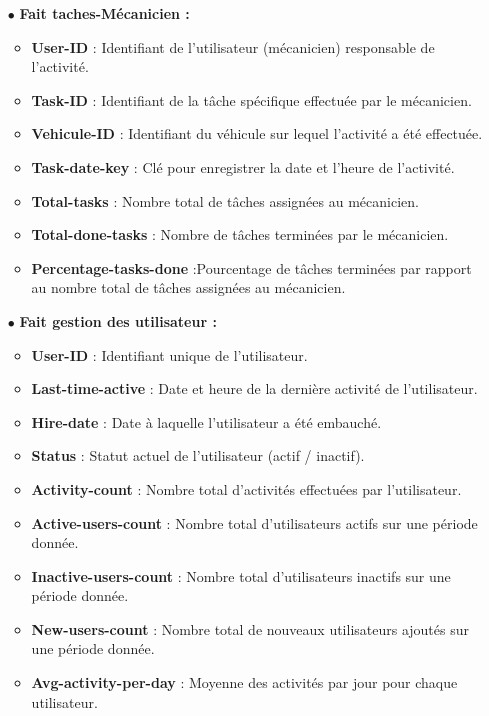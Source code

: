 \begin{itemize}
    \item[$\bullet$] \large\textbf{ Fait taches-Mécanicien :}
          \begin{itemize}[leftmargin=2em]
              \item \textbf{User-ID} : Identifiant de l'utilisateur (mécanicien) responsable de l'activité.        \item \textbf{Task-ID} : Identifiant de la tâche spécifique effectuée par le mécanicien.
              \item \textbf{Vehicule-ID} : Identifiant du véhicule sur lequel l'activité a été effectuée.
              \item \textbf{Task-date-key} : Clé pour enregistrer la date et l'heure de l'activité.
              \item \textbf{Total-tasks} : Nombre total de tâches assignées au mécanicien.
              \item \textbf{Total-done-tasks} : Nombre de tâches terminées par le mécanicien.
              \item \textbf{Percentage-tasks-done} :Pourcentage de tâches terminées par rapport au nombre total de tâches assignées au mécanicien.
          \end{itemize}
\end{itemize}

\bigskip
\begin{itemize}
    \item[$\bullet$] \large\textbf{ Fait gestion des utilisateur :}
          \begin{itemize}[leftmargin=2em]
              \item \textbf{User-ID} : Identifiant unique de l'utilisateur.
              \item \textbf{Last-time-active} : Date et heure de la dernière activité de l'utilisateur.
              \item \textbf{Hire-date} : Date à laquelle l'utilisateur a été embauché.
              \item \textbf{Status} : Statut actuel de l'utilisateur (actif / inactif).
              \item \textbf{Activity-count} : Nombre total d'activités effectuées par l'utilisateur.
              \item \textbf{Active-users-count} : Nombre total d'utilisateurs actifs sur une période donnée.
              \item \textbf{Inactive-users-count} : Nombre total d'utilisateurs inactifs sur une période donnée.
              \item \textbf{New-users-count} : Nombre total de nouveaux utilisateurs ajoutés sur une période donnée.
              \item \textbf{Avg-activity-per-day} : Moyenne des activités par jour pour chaque utilisateur.

          \end{itemize}
\end{itemize}

